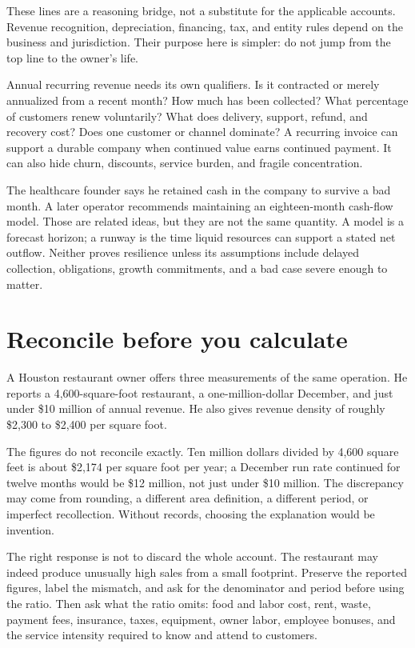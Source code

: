 These lines are a reasoning bridge, not a substitute for the applicable
accounts. Revenue recognition, depreciation, financing, tax, and entity rules
depend on the business and jurisdiction. Their purpose here is simpler: do not
jump from the top line to the owner's life.

Annual recurring revenue needs its own qualifiers. Is it contracted or merely
annualized from a recent month? How much has been collected? What percentage of
customers renew voluntarily? What does delivery, support, refund, and recovery
cost? Does one customer or channel dominate? A recurring invoice can support a
durable company when continued value earns continued payment. It can also hide
churn, discounts, service burden, and fragile concentration.

The healthcare founder says he retained cash in the company to survive a bad
month. A later operator recommends maintaining an eighteen-month cash-flow
model. Those are related ideas, but they are not the same quantity. A model is
a forecast horizon; a runway is the time liquid resources can support a stated
net outflow. Neither proves resilience unless its assumptions include delayed
collection, obligations, growth commitments, and a bad case severe enough to
matter.

\section{Reconcile before you calculate}

A Houston restaurant owner offers three measurements of the same operation. He
reports a 4,600-square-foot restaurant, a one-million-dollar December, and just
under \$10 million of annual revenue. He also gives revenue density of roughly
\$2,300 to \$2,400 per square foot.

The figures do not reconcile exactly. Ten million dollars divided by 4,600
square feet is about \$2,174 per square foot per year; a December run rate
continued for twelve months would be \$12 million, not just under \$10 million.
The discrepancy may come from rounding, a different area definition, a
different period, or imperfect recollection. Without records, choosing the
explanation would be invention.

The right response is not to discard the whole account. The restaurant may
indeed produce unusually high sales from a small footprint. Preserve the
reported figures, label the mismatch, and ask for the denominator and period
before using the ratio. Then ask what the ratio omits: food and labor cost,
rent, waste, payment fees, insurance, taxes, equipment, owner labor, employee
bonuses, and the service intensity required to know and attend to customers.


